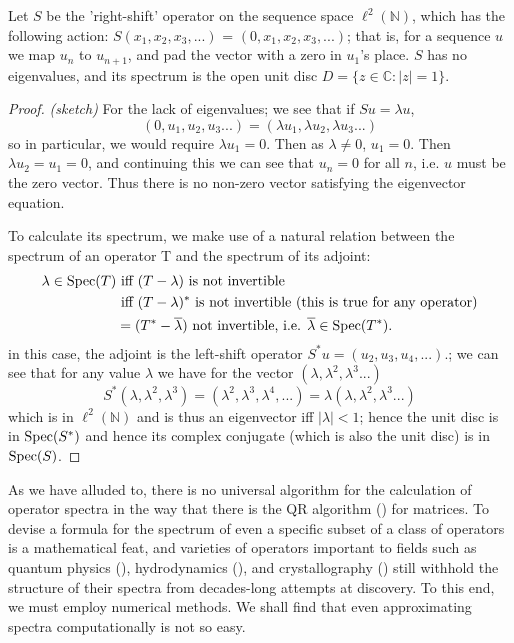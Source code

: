 \documentclass[../main.tex]{subfiles}
\begin{document}
\begin{example}
Let $S$ be the 'right-shift' operator on the sequence space $\ell^2(\mathbb{N})$, which has the following action:
$S(x_1, x_2, x_3, ...)$ = $(0, x_1, x_2, x_3, ...)$; that is, for a sequence $u$ we map $u_n$ to $u_{n+1}$, and pad the vector with a zero in $u_1$'s place.
$S$ has no eigenvalues, and its spectrum is the open unit disc $D = \{z \in \mathbb{C} : |z| = 1\}$.
\end{example}
\begin{proof}{\emph{(sketch)}}
For the lack of eigenvalues; we see that if $Su = \lambda u$, 
$$(0, u_1, u_2, u_3 ...) = (\lambda u_1, \lambda u_2, \lambda u_3 ...)$$
so in particular, we would require $\lambda u_1 = 0$. Then as $\lambda \neq 0$, $u_1 =0$. Then $\lambda u_2 = u_1 = 0$, and continuing this we
can see that $u_n = 0$ for all $n$, i.e. $u$ must be the zero vector. Thus there is no non-zero vector satisfying the eigenvector equation.

To calculate its spectrum, we make use of a natural relation between the spectrum of an operator T and the spectrum of its adjoint: 
\begin{align*}
\lambda \in \mathrm{Spec}(T)  &\text{ iff } (T - \lambda)\text{ is not invertible }\\
& \text{ iff } (T - \lambda)^*\text{ is not invertible (this is true for any operator)}\\
& = (T^* - \overline{\lambda}) \text{ not invertible, i.e. } \overline{\lambda} \in \mathrm{Spec}(T^*).
\end{align*}
in this case, the adjoint is the left-shift operator $S^*u = (u_2, u_3, u_4, ...).$; we can see that for any value $\lambda$ we have for the vector
$(\lambda, \lambda^2, \lambda^3...)$
$$S^*(\lambda, \lambda^2, \lambda^3) = (\lambda^2, \lambda^3, \lambda^4, ...) = \lambda(\lambda, \lambda^2, \lambda^3...)$$
which is in $\ell^2(\mathbb{N})$ and is thus an eigenvector iff $|\lambda| < 1$; hence the unit disc is in $\mathrm{Spec}(S^*)$ and hence its
complex conjugate (which is also the unit disc) is in $\mathrm{Spec}(S)$.
\end{proof}

As we have alluded to, there is no universal algorithm for the calculation of operator spectra in the way that there is the QR algorithm (\parencite{francis1961qr}) for matrices. To devise a formula for the spectrum of even a specific subset of a class of operators is a mathematical
feat, and varieties of operators important to fields such as quantum physics (\cite{lewin2010spectral}), hydrodynamics (\cite{manning2008descriptor}), and crystallography (\cite{cances2012periodic}) still withhold the structure of their spectra from decades-long attempts at discovery. 
To this end, we must employ numerical methods.
We shall find that even approximating spectra computationally is not so easy.
\end{document}

